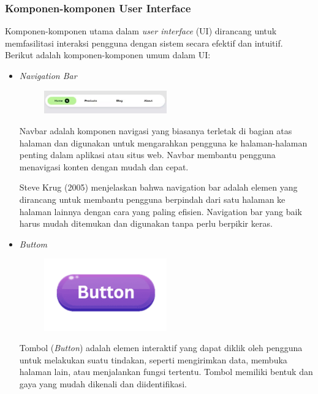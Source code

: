 \documentclass[12pt]{article}
\begin{document}
\subsubsection{Komponen-komponen User Interface}
Komponen-komponen utama dalam \emph{user interface} (UI) dirancang untuk memfasilitasi interaksi pengguna dengan sistem secara efektif dan intuitif. Berikut adalah komponen-komponen umum dalam UI:

\begin{itemize}

\item \emph{Navigation Bar}

\begin{figure}[h] %
    \centering
    \includegraphics[width=0.5\textwidth]{asset/navbar.png}
\end{figure}

\par Navbar adalah komponen navigasi yang biasanya terletak di bagian atas halaman dan digunakan untuk mengarahkan pengguna ke halaman-halaman penting dalam aplikasi atau situs web. Navbar membantu pengguna menavigasi konten dengan mudah dan cepat.

\par Steve Krug (2005) menjelaskan bahwa navigation bar adalah elemen yang dirancang untuk membantu pengguna berpindah dari satu halaman ke halaman lainnya dengan cara yang paling efisien. Navigation bar yang baik harus mudah ditemukan dan digunakan tanpa perlu berpikir keras.

\item \emph{Buttom}

\begin{figure}[h] %
    \centering
    \includegraphics[width=0.5\textwidth]{asset/button.png}
\end{figure}

\par Tombol (\emph{Button}) adalah elemen interaktif yang dapat diklik oleh pengguna untuk melakukan suatu tindakan, seperti mengirimkan data, membuka halaman lain, atau menjalankan fungsi tertentu. Tombol memiliki bentuk dan gaya yang mudah dikenali dan diidentifikasi.


\end{itemize}
\end{document}
